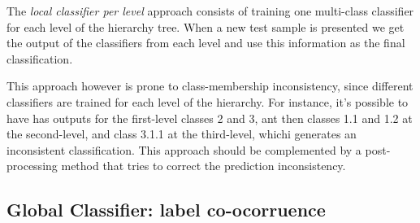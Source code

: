 \documentclass[11pt]{article}
\begin{document}



The \textit{local classifier per level} approach consists of training one multi-class classifier
for each level of the hierarchy tree. When a new test sample is presented we get the output of the
classifiers from each level and use this information as the final classification.

This approach however is prone to class-membership inconsistency, since different classifiers are
trained for each level of the hierarchy. For instance, it's possible to have has outputs for the
first-level classes 2 and 3, ant then classes 1.1 and 1.2 at the second-level, and class 3.1.1
at the third-level, whichi generates an inconsistent classification. This approach should
be complemented by a post-processing method that tries to correct the prediction inconsistency.



\begin{comment}
In essence, in this top-down approach, for each new example in the test set, the system first
predicts its first-level (most generic) class, then it uses that predicted class to narrow
the choices of classes to be predicted at the second level (the only valid candidate
second-level classes are the children of the class predicted at the first level), and so on,
recursively, until the most specific prediction is made.

This local approach has some disadvantages, a disadvantage of the top-down class-prediction
approach (which is shared by all the three types of local classifiers discussed next) is that an
error at a certain class level is going to be propagated downwards the hierarchy, unless some
procedure for avoiding this problem is used
\end{comment}



\subsection{Global Classifier: label co-ocorruence}
\end{document}
